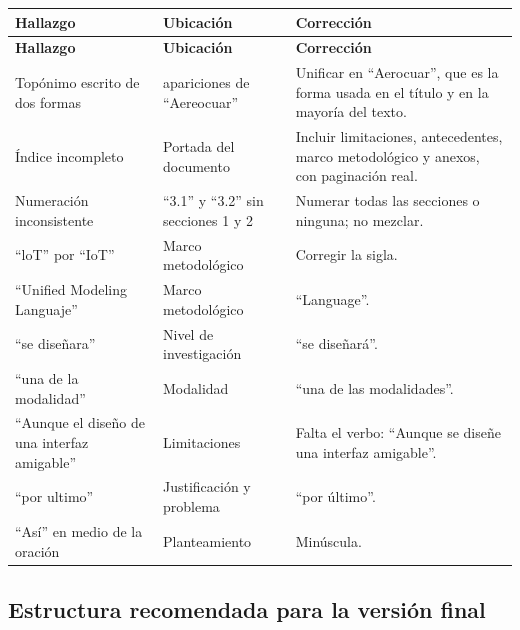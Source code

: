 \documentclass[11pt,a4paper]{article}
\begin{document}
\begingroup\small
\begin{longtable}{@{}>{\raggedright\arraybackslash}p{4.4cm} >{\raggedright\arraybackslash}p{3.2cm} >{\raggedright\arraybackslash}p{8.0cm}@{}}
\toprule
\textbf{Hallazgo} & \textbf{Ubicación} & \textbf{Corrección} \\
\midrule
\endfirsthead
\toprule
\textbf{Hallazgo} & \textbf{Ubicación} & \textbf{Corrección} \\
\midrule
\endhead
Topónimo escrito de dos formas & 5 apariciones de ``Aereocuar'' & Unificar en ``Aerocuar'', que es la forma usada en el título y en la mayoría del texto. \\
Índice incompleto & Portada del documento & Incluir limitaciones, antecedentes, marco metodológico y anexos, con paginación real. \\
Numeración inconsistente & ``3.1'' y ``3.2'' sin secciones 1 y 2 & Numerar todas las secciones o ninguna; no mezclar. \\
``loT'' por ``IoT'' & Marco metodológico & Corregir la sigla. \\
``Unified Modeling Languaje'' & Marco metodológico & ``Language''. \\
``se diseñara'' & Nivel de investigación & ``se diseñará''. \\
``una de la modalidad'' & Modalidad & ``una de las modalidades''. \\
``Aunque el diseño de una interfaz amigable'' & Limitaciones & Falta el verbo: ``Aunque se diseñe una interfaz amigable''. \\
``por ultimo'' & Justificación y problema & ``por último''. \\
``Así'' en medio de la oración & Planteamiento & Minúscula. \\
\bottomrule
\end{longtable}
\endgroup

\subsection{Estructura recomendada para la versión final}
\end{document}
